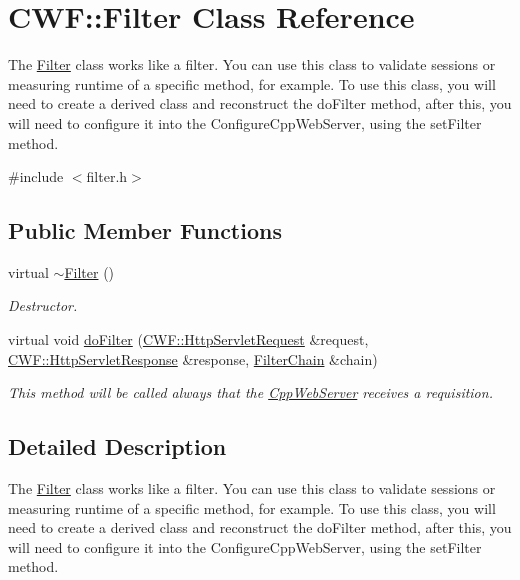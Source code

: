 \hypertarget{class_c_w_f_1_1_filter}{\section{C\+W\+F\+:\+:Filter Class Reference}
\label{class_c_w_f_1_1_filter}
}


The \hyperlink{class_c_w_f_1_1_filter}{Filter} class works like a filter. You can use this class to validate sessions or measuring runtime of a specific method, for example. To use this class, you will need to create a derived class and reconstruct the do\+Filter method, after this, you will need to configure it into the Configure\+Cpp\+Web\+Server, using the set\+Filter method.  




{\ttfamily \#include $<$filter.\+h$>$}

\subsection*{Public Member Functions}
\begin{DoxyCompactItemize}
\item 
virtual \hyperlink{class_c_w_f_1_1_filter_aa0ba072123bbcd95de94ff17d65e35aa}{$\sim$\+Filter} ()
\begin{DoxyCompactList}\small\item\em Destructor. \end{DoxyCompactList}\item 
virtual void \hyperlink{class_c_w_f_1_1_filter_aa66add142c4f09a0b26f8d97a59650ba}{do\+Filter} (\hyperlink{class_c_w_f_1_1_http_servlet_request}{C\+W\+F\+::\+Http\+Servlet\+Request} \&request, \hyperlink{class_c_w_f_1_1_http_servlet_response}{C\+W\+F\+::\+Http\+Servlet\+Response} \&response, \hyperlink{class_c_w_f_1_1_filter_chain}{Filter\+Chain} \&chain)
\begin{DoxyCompactList}\small\item\em This method will be called always that the \hyperlink{class_c_w_f_1_1_cpp_web_server}{Cpp\+Web\+Server} receives a requisition. \end{DoxyCompactList}\end{DoxyCompactItemize}


\subsection{Detailed Description}
The \hyperlink{class_c_w_f_1_1_filter}{Filter} class works like a filter. You can use this class to validate sessions or measuring runtime of a specific method, for example. To use this class, you will need to create a derived class and reconstruct the do\+Filter method, after this, you will need to configure it into the Configure\+Cpp\+Web\+Server, using the set\+Filter method. 


